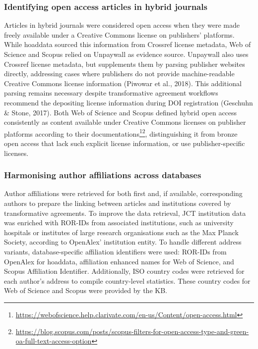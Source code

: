 \documentclass[a4paper,man,floatsintext,longtable,noextraspace,10pt]{apa6}
\begin{document}
\subsubsection{Identifying open access articles in hybrid
journals}\label{identifying-open-access-articles-in-hybrid-journals}

Articles in hybrid journals were considered open access when they were
made freely available under a Creative Commons license on publishers'
platforms. While hoaddata sourced this information from Crossref license
metadata, Web of Science and Scopus relied on Unpaywall as evidence
source. Unpaywall also uses Crossref license metadata, but supplements
them by parsing publisher websites directly, addressing cases where
publishers do not provide machine-readable Creative Commons license
information (Piwowar et al., 2018). This additional parsing remains
necessary despite transformative agreement workflows recommend the
depositing license information during DOI registration (Geschuhn \&
Stone, 2017). Both Web of Science and Scopus defined hybrid open access
consistently as content available under Creative Commons licenses on
publisher platforms according to their
documentations\footnote{\url{https://webofscience.help.clarivate.com/en-us/Content/open-access.html}}\footnote{\url{https://blog.scopus.com/posts/scopus-filters-for-open-access-type-and-green-oa-full-text-access-option}},
distinguishing it from bronze open access that lack such explicit
license information, or use publisher-specific licenses.

\subsubsection{Harmonising author affiliations across
databases}\label{harmonising-author-affiliations-across-databases}

Author affiliations were retrieved for both first and, if available,
corresponding authors to prepare the linking between articles and
institutions covered by transformative agreements. To improve the data
retrieval, JCT institution data was enriched with ROR-IDs from
associated institutions, such as university hospitals or institutes of
large research organisations such as the Max Planck Society, according
to OpenAlex' institution entity. To handle different address variants,
database-specific affiliation identifiers were used: ROR-IDs from
OpenAlex for hoaddata, affiliation enhanced names for Web of Science,
and Scopus Affiliation Identifier. Additionally, ISO country codes were
retrieved for each author's address to compile country-level statistics.
These country codes for Web of Science and Scopus were provided by the
KB.
\end{document}
